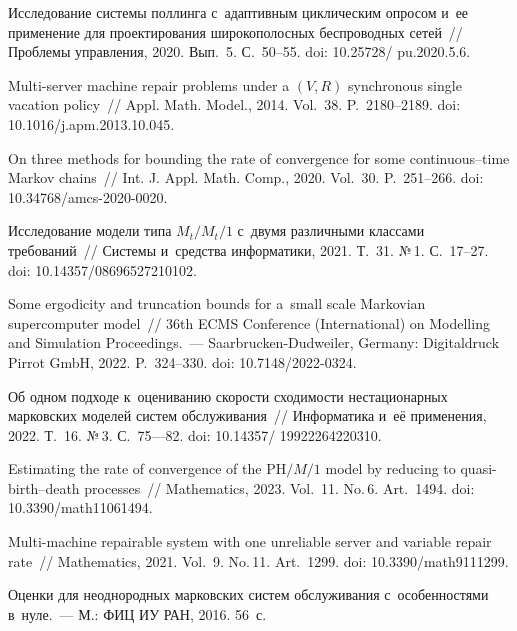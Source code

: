 \begin{multicols}{2}
{{\begin{thebibliography}{99}
 Исследование сис\-те\-мы  поллинга
с~адап\-тив\-ным циклическим опро\-сом и~ее применение для \mbox{проектирования}
широкополосных беспроводных сетей~// Проблемы управ\-ле\-ния, 2020. Вып.~5. С.~50--55.
doi: 10.25728/ pu.2020.5.6.



Multi-server machine repair 
problems under a $(V,R)$ synchronous single vacation policy~// Appl. Math. Model., 2014. Vol.~38. P.~2180--2189.
doi: 10.1016/j.apm.2013.10.045.

 On three methods for bounding the rate of convergence 
for some continuous--time Markov chains~// Int. J. Appl. Math. Comp., 2020. Vol.~30. P.~251--266. doi: 10.34768/amcs-2020-0020.

 Исследование модели типа $M_t/M_t/1 $ с~двумя различными 
классами требований~// Сис\-те\-мы и~средства информатики, 2021. Т.~31. №\,1. С.~17--27.
doi: 10.14357/08696527210102.

 Some ergodicity and truncation bounds for a~small scale Markovian supercomputer model~// 
36th ECMS Conference (International) on Modelling and Simulation Proceedings.~--- Saarbrucken-Dudweiler,
Germany: Digitaldruck Pirrot GmbH, 2022. 
P.~324--330.  doi: 10.7148/2022-0324.

 Об одном 
подходе к~оцениванию ско\-рости схо\-ди\-мости нестационарных марковских моделей 
сис\-тем обслуживания~// Информатика и~её применения, 2022. Т.~16. №\,3. С.~75---82.   
doi: 10.14357/ 19922264220310. 

 Estimating the rate of 
convergence of the $\mathrm{PH}/M/1$ model by reducing to quasi-birth--death processes~// 
Mathematics, 2023. Vol.~11. No.\,6. Art.~1494. doi: 10.3390/math11061494.

 Multi-machine repairable system with one
unreliable server and variable repair rate~// Mathematics, 2021. Vol.~9. No.\,11. Art.~1299.  
doi: 10.3390/math9111299. 


Оценки для неоднородных марковских сис\-тем обслуживания с~особенностями в~нуле.~--- М.: ФИЦ ИУ РАН, 2016. 56~с.
\end{thebibliography}

 }
 }

\end{multicols}

